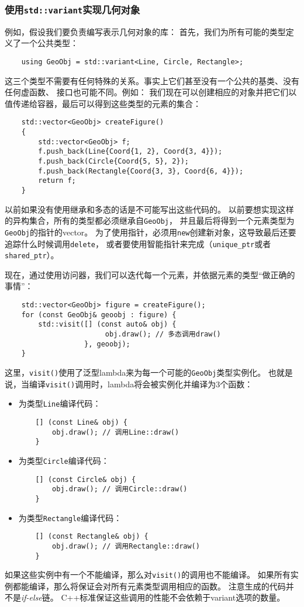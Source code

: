 \subsubsection{使用\texttt{std::variant}实现几何对象}
例如，假设我们要负责编写表示几何对象的库：
首先，我们为所有可能的类型定义了一个公共类型：
\begin{lstlisting}
    using GeoObj = std::variant<Line, Circle, Rectangle>;
\end{lstlisting}
这三个类型不需要有任何特殊的关系。事实上它们甚至没有一个公共的基类、没有任何虚函数、
接口也可能不同。例如：
我们现在可以创建相应的对象并把它们以值传递给容器，最后可以得到这些类型的元素的集合：
\begin{lstlisting}
    std::vector<GeoObj> createFigure()
    {
        std::vector<GeoObj> f;
        f.push_back(Line{Coord{1, 2}, Coord{3, 4}});
        f.push_back(Circle{Coord{5, 5}, 2});
        f.push_back(Rectangle{Coord{3, 3}, Coord{6, 4}});
        return f;
    }
\end{lstlisting}
以前如果没有使用继承和多态的话是不可能写出这些代码的。
以前要想实现这样的异构集合，所有的类型都必须继承自\texttt{GeoObj}，
并且最后将得到一个元素类型为\texttt{GeoObj}的指针的vector。
为了使用指针，必须用\texttt{new}创建新对象，这导致最后还要追踪什么时候调用\texttt{delete}，
或者要使用智能指针来完成（\texttt{unique\_ptr}或者\texttt{shared\_ptr}）。

现在，通过使用访问器，我们可以迭代每一个元素，并依据元素的类型“做正确的事情”：
\begin{lstlisting}
    std::vector<GeoObj> figure = createFigure();
    for (const GeoObj& geoobj : figure) {
        std::visit([] (const auto& obj) {
                        obj.draw(); // 多态调用draw()
                   }, geoobj);
    }
\end{lstlisting}
这里，\texttt{visit()}使用了泛型lambda来为每一个可能的\texttt{GeoObj}类型实例化。
也就是说，当编译\texttt{visit()}调用时，lambda将会被实例化并编译为3个函数：
\begin{itemize}[leftmargin=*]
    \item 为类型\texttt{Line}编译代码：
    \begin{lstlisting}
    [] (const Line& obj) {
        obj.draw(); // 调用Line::draw()
    }
    \end{lstlisting}
    \item 为类型\texttt{Circle}编译代码：
    \begin{lstlisting}
    [] (const Circle& obj) {
        obj.draw(); // 调用Circle::draw()
    }
    \end{lstlisting}
    \item 为类型\texttt{Rectangle}编译代码：
    \begin{lstlisting}
    [] (const Rectangle& obj) {
        obj.draw(); // 调用Rectangle::draw()
    }
    \end{lstlisting}
\end{itemize}
如果这些实例中有一个不能编译，那么对\texttt{visit()}的调用也不能编译。
如果所有实例都能编译，那么将保证会对所有元素类型调用相应的函数。
注意生成的代码并不是\emph{if-else}链。
C++标准保证这些调用的性能不会依赖于variant选项的数量。

